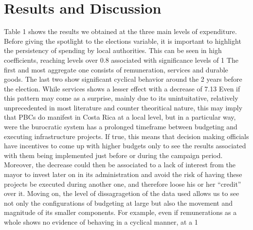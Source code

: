 \section{Results and Discussion}
	Table 1 shows the results we obtained at the three main levels of expenditure. Before giving the spotlight to the elections variable, it is important to highlight the persistency of spending by local authorities. This can be seen in high coefficients, reaching levels over 0.8 associated with significance levels of 1%
	The first and most aggregate one consists of remuneration, services and durable goods. The last two show significant cyclical behavior around the 2 years before the election. While services shows a lesser effect with a decrease of 7.13%
	Even if this pattern may come as a surprise, mainly due to its unintuitative, relatively unprecedented in most literature and counter theoritical nature, this may imply that PBCs do manifest in Costa Rica at a local level, but in a particular way, were the burocratic system has a prolonged timeframe between budgeting and executing infrastructure projects. If true, this means that decision making officials have incentives to come up with higher budgets only to see the results associated with them being implemented just before or during the campaign period. Moreover, the decrease could then be associated to a lack of interest from the mayor to invest later on in its administration and avoid the risk of having these projects be executed during another one, and therefore loose his or her “credit” over it. 
	Moving on, the level of dissagragetion of the data used allows us to see not only the configurations of budgeting at large but also the movement and magnitude of its smaller components. For example, even if remunerations as a whole shows no evidence of behaving in a cyclical manner, at a 1%
